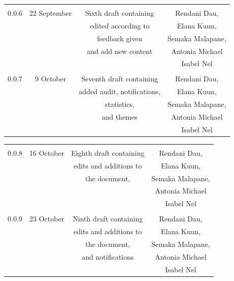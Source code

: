 \documentclass[a4paper,12pt]{report}
\begin{document}
\begin{table}[h!]
\begin{tabular}{||c c c c||}
  \hline 
 & & & \\
 0.0.6& 22 September &  Sixth draft containing  & Rendani Dau, \\ & & edited according to & Elana Kuun, \\ & & feedback given & Semaka Malapane, \\ & & and add new content &  Antonia Michael \\ & & & Isabel Nel \\   [1ex]  
 \hline 
 & & & \\
 0.0.7& 9 October &  Seventh draft containing  & Rendani Dau, \\ & & added audit, notifications, & Elana Kuun, \\ & & statistics, & Semaka Malapane, \\ & &  and themes &  Antonia Michael \\ & & & Isabel Nel \\   [1ex]  
 \hline 
 \end{tabular}
\end{table}

\makeatletter
\setlength{\@fptop}{0pt}
\makeatother

\begin{table}[h!]
 \begin{tabular}{||c c c c||} 
 \hline 
 & & & \\
 0.0.8& 16 October &  Eighth draft containing  & Rendani Dau, \\ & & edits and additions to & Elana Kuun, \\ & & the document, & Semaka Malapane, \\ & &  &  Antonia Michael \\ & & & Isabel Nel \\   [1ex]  
 \hline 
 & & & \\
 0.0.9& 23 October &  Ninth draft containing  & Rendani Dau, \\ & & edits and additions to & Elana Kuun, \\ & & the document, & Semaka Malapane, \\ & &  and notifications &  Antonia Michael \\ & & & Isabel Nel \\   [1ex]  
\hline
 \end{tabular}
\end{table}

\pagebreak
\pagebreak
\end{document}
